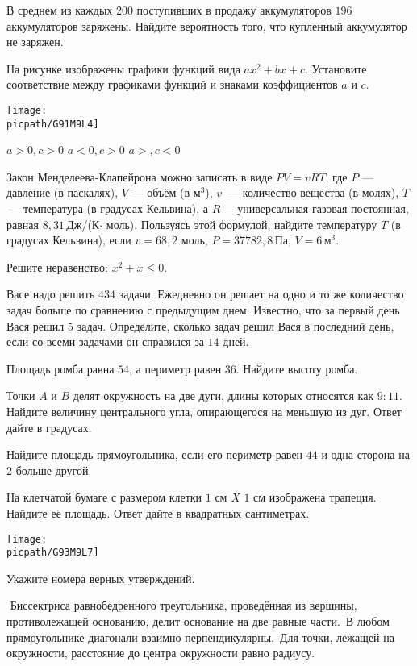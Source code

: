\begin{class}[number=7]
\begin{listofex}
		\item В среднем из каждых \(200\) поступивших в продажу аккумуляторов \(196\) аккумуляторов заряжены. Найдите вероятность того, что купленный аккумулятор не заряжен.
		\item На рисунке изображены графики функций вида \(ax^2+bx+c\). Установите соответствие между графиками функций и знаками коэффициентов \(a\) и \(c\).
		\begin{center}
			\texttt{[image: \\picpath/G91M9L4]}
		\end{center}
		\begin{tasks}
			\task \( a>0, c>0 \)
			\task \( a<0, c>0 \)
			\task \( a>, c<0 \)
		\end{tasks}
		\item Закон Менделеева-Клапейрона можно записать в виде \(PV=vRT\), где \(P\) --- давление (в паскалях), \(V\) --- объём (в м\(^3\)), \(v\)  --- количество вещества (в молях), \(T\) --- температура (в градусах Кельвина), а \(R\) --- универсальная газовая постоянная, равная \(8,31\) Дж/(К\(\cdot\) моль). Пользуясь этой формулой, найдите температуру \(T\) (в градусах Кельвина), если \(v=68,2\) моль, \(P=37 782,8\) Па, \(V=6\) м\(^3\).
		\item Решите неравенство: \(x^2+x\le0\).
		\item Васе надо решить \(434\) задачи. Ежедневно он решает на одно и то же количество задач больше по сравнению с предыдущим днем. Известно, что за первый день Вася решил \(5\) задач. Определите, сколько задач решил Вася в последний день, если со всеми задачами он справился за \(14\) дней.
		\item Площадь ромба равна \( 54 \), а периметр равен \( 36 \). Найдите высоту ромба.
		\item Точки \(A\) и \(B\) делят окружность на две дуги, длины которых относятся как \(9:11\). Найдите величину центрального угла, опирающегося на меньшую из дуг. Ответ дайте в градусах.
		\item Найдите площадь прямоугольника, если его периметр равен \(44\) и одна сторона на \(2\) больше другой.
		\item На клетчатой бумаге с размером клетки \( 1 \) см \( X \) \( 1 \) см изображена трапеция. Найдите её площадь. Ответ дайте в квадратных сантиметрах.
		\begin{center}
			\texttt{[image: \\picpath/G93M9L7]}
		\end{center}
		\item Укажите номера верных утверждений.
		\begin{tasks}
			\task  Биссектриса равнобедренного треугольника, проведённая из вершины, противолежащей основанию, делит основание на две равные части.
			\task В любом прямоугольнике диагонали взаимно перпендикулярны.
			\task Для точки, лежащей на окружности, расстояние до центра окружности равно радиусу.
		\end{tasks}
	\end{listofex}
\end{class}

